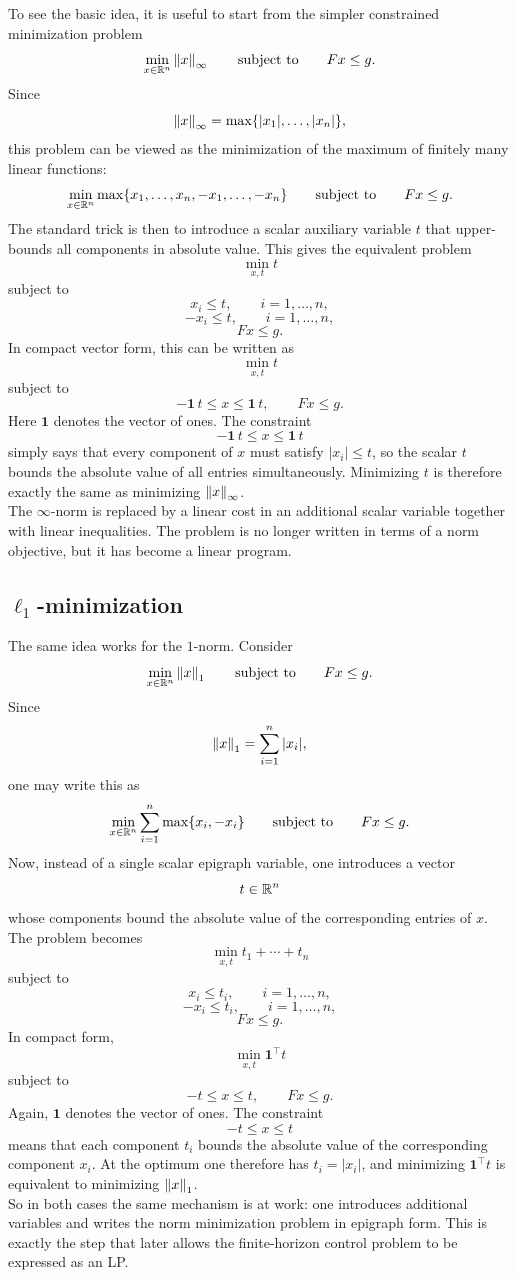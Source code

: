 To see the basic idea, it is useful to start from the simpler constrained minimization problem
\[
\min_{x\in\mathbb{R}^n}\left\lVert x \right\rVert_\infty
\qquad \text{subject to}\qquad
Fx\le g.
\]
Since
\[
\left\lVert x \right\rVert_\infty=\max\{|x_1|,\dots,|x_n|\},
\]
this problem can be viewed as the minimization of the maximum of finitely many linear
functions:
\[
\min_{x\in\mathbb{R}^n}
\max\{x_1,\dots,x_n,-x_1,\dots,-x_n\}
\qquad \text{subject to}\qquad
Fx\le g.
\]
The standard trick is then to introduce a scalar auxiliary variable \(t\) that upper-bounds all
components in absolute value. This gives the equivalent problem
\[
\min_{x,t} t
\]
subject to
\[
x_i\le t,\qquad i=1,\dots,n,
\]
\[
-x_i\le t,\qquad i=1,\dots,n,
\]
\[
Fx\le g.
\]
In compact vector form, this can be written as
\[
\min_{x,t} t
\]
subject to
\[
-\mathbf 1\, t \le x \le \mathbf 1\, t,
\qquad
Fx\le g.
\]
Here \(\mathbf 1\) denotes the vector of ones. The constraint
\[
-\mathbf 1\, t \le x \le \mathbf 1\, t
\]
simply says that every component of \(x\) must satisfy \(|x_i|\le t\), so the scalar \(t\)
bounds the absolute value of all entries simultaneously. Minimizing \(t\) is therefore exactly
the same as minimizing \(\left\lVert x \right\rVert_\infty\).\\
The \(\infty\)-norm is replaced by a linear cost in an
additional scalar variable together with linear inequalities. The problem is no longer written in
terms of a norm objective, but it has become a linear program.

\subsection{\(\ell_1\)-minimization}

The same idea works for the \(1\)-norm. Consider
\[
\min_{x\in\mathbb{R}^n}\left\lVert x \right\rVert_1
\qquad \text{subject to}\qquad
Fx\le g.
\]
Since
\[
\left\lVert x \right\rVert_1=\sum_{i=1}^n |x_i|,
\]
one may write this as
\[
\min_{x\in\mathbb{R}^n}
\sum_{i=1}^n \max\{x_i,-x_i\}
\qquad \text{subject to}\qquad
Fx\le g.
\]
Now, instead of a single scalar epigraph variable, one introduces a vector
\[
t\in\mathbb{R}^n
\]
whose components bound the absolute value of the corresponding entries of \(x\). The problem
becomes
\[
\min_{x,t} t_1+\cdots+t_n
\]
subject to
\[
x_i\le t_i,\qquad i=1,\dots,n,
\]
\[
-x_i\le t_i,\qquad i=1,\dots,n,
\]
\[
Fx\le g.
\]
In compact form,
\[
\min_{x,t} \mathbf 1^\top t
\]
subject to
\[
-t\le x\le t,
\qquad
Fx\le g.
\]
Again, \(\mathbf 1\) denotes the vector of ones. The constraint
\[
-t\le x\le t
\]
means that each component \(t_i\) bounds the absolute value of the corresponding component
\(x_i\). At the optimum one therefore has \(t_i=|x_i|\), and minimizing \(\mathbf 1^\top t\)
is equivalent to minimizing \(\left\lVert x \right\rVert_1\).\\
So in both cases the same mechanism is at work: one introduces additional variables and writes
the norm minimization problem in epigraph form. This is exactly the step that later allows the
finite-horizon control problem to be expressed as an LP.


